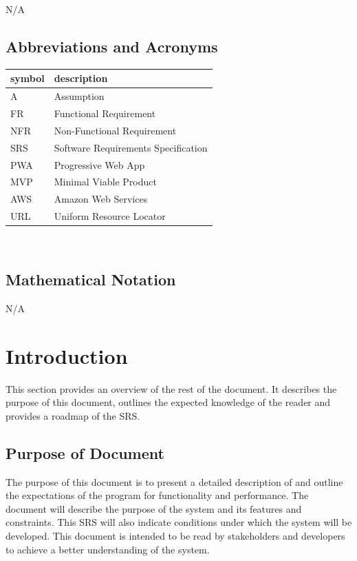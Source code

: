 \documentclass[12pt]{article}
\begin{document}
N/A

\subsection{Abbreviations and Acronyms}

\renewcommand{\arraystretch}{1.2}
\begin{tabular}{l l} 
  \toprule		
  \textbf{symbol} & \textbf{description}\\
  \midrule 
  A & Assumption\\
  FR & Functional Requirement\\
  NFR & Non-Functional Requirement\\
  SRS & Software Requirements Specification\\
  PWA & Progressive Web App\\
  MVP & Minimal Viable Product\\
  AWS & Amazon Web Services\\
  URL & Uniform Resource Locator\\
  \bottomrule
\end{tabular}\\
\subsection{Mathematical Notation}

N/A

\newpage


\section{Introduction}

This section provides an overview of the rest of the document. It describes the purpose of this document, outlines the expected knowledge of the reader and provides a roadmap of the SRS.

\subsection{Purpose of Document}

  The purpose of this document is to present a detailed description of \progname{} and outline the expectations of the program for functionality and performance. The document will describe the purpose of the system and its features and constraints. This SRS will also indicate conditions under which the system will be developed. This document is intended to be read by stakeholders and developers to achieve a better understanding of the system.
\end{document}
